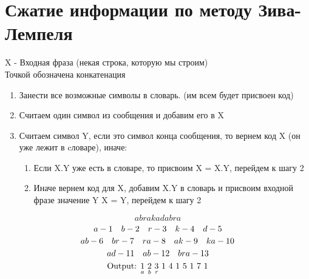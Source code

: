 \documentclass[discrete.tex]{subfiles}
\begin{document}
\section{Сжатие информации по методу Зива-Лемпеля}

\begin{definition} [Алгоритм]
    X - Входная фраза (некая строка, которую мы строим)\\
    Точкой обозначена конкатенация
    \begin{enumerate}
        \item Занести все возможные символы в словарь. (им всем будет присвоен код)
        \item Считаем один символ из сообщения и добавим его в X
        \item Считаем символ Y, если это символ конца сообщения, то вернем код X (он уже
            лежит в cловаре), иначе:
            \begin{enumerate}
                \item Если X.Y уже есть в словаре, то присвоим X = X.Y, перейдем к шагу 2
                \item Иначе вернем код для X, добавим X.Y в словарь и присвоим входной
                    фразе значение Y \q X = Y, перейдем к шагу 2
            \end{enumerate}
    \end{enumerate}
\end{definition}

\begin{Example}
    \[abrakadabra\]
    \[a - 1 \quad b - 2 \quad r - 3 \quad k - 4 \quad d - 5\]
    \[ab - 6 \quad br - 7 \quad ra - 8 \quad ak - 9 \quad ka - 10\]
    \[ad - 11 \quad ab - 12 \quad bra - 13\]
    \[\text{Output: } \us{a}{1} \ \us{b}{2} \ \us{r}{3} \ 1 \ 4 \ 1 \ 5 \ 1 \ 7 \ 1\]
\end{Example}
\end{document}
